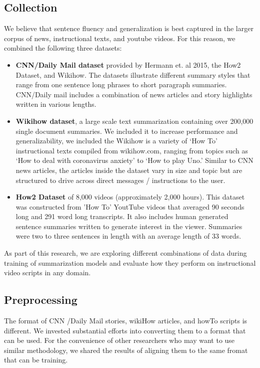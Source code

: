 \documentclass{article}
\begin{document}
\subsection{Collection}
We believe that sentence fluency and generalization is best captured in the larger corpus of news, instructional texts, and youtube videos. For this reason, we combined the following three datasets: 
\begin{itemize}

\item \textbf{CNN/Daily Mail dataset} provided by Hermann et. al 2015, the How2 Dataset, and Wikihow. The datasets illustrate different summary styles that range from one sentence long phrases to short paragraph summaries. CNN/Daily mail includes a combination of news articles and story highlights written in various lengths. 
\item \textbf{Wikihow dataset}, a large scale text summarization containing over 200,000 single document summaries. We included it to increase performance and generalizability, we included the  Wikihow is a variety of ‘How To’ instructional texts compiled from wikihow.com, ranging from topics such as ‘How to deal with coronavirus anxiety’ to ‘How to play Uno.’ Similar to CNN news articles, the articles inside the dataset vary in size and topic but are structured to drive across direct messages / instructions to the user. 
\item \textbf{How2 Dataset} of 8,000 videos (approximately 2,000 hours). This dataset was constructed from 'How To' YoutTube videos that averaged 90 seconds long and 291 word long transcripts. It also includes human generated sentence summaries written to generate interest in the viewer. Summaries were two to three sentences in length with an average length of 33 words. 
\end{itemize}

As part of this research, we are exploring different combinations of data during training of summarization models and evaluate how they perform on  instructional video scripts in any domain.  


\subsection{Preprocessing}

The format of CNN /Daily Mail stories, wikiHow articles, and howTo scripts is different. We invested substantial efforts into converting them to a format that can be used. For the convenience of other researchers who may want to use similar methodology, we shared the results of aligning them to the same fromat that can be training. 
\end{document}

